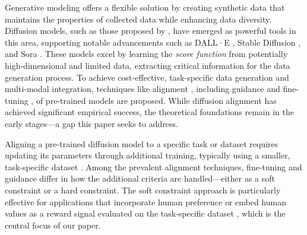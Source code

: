 \documentclass{article}
\begin{document}
Generative modeling offers a flexible solution by creating synthetic data that maintains the properties of collected data while enhancing data diversity. Diffusion models, such as those proposed by \cite{sohl2015deep,song2019generative,song2020score,Ho20}, have emerged as powerful tools in this area, supporting notable advancements such as DALL·E \cite{ramesh2022hierarchical,betker2023improving}, Stable Diffusion \cite{rombach2022high}, and Sora \cite{openai2024sora}. These models excel by learning the {\it score function} from potentially high-dimensional and limited data, extracting critical information for the data generation process. To achieve cost-effective, task-specific data generation and multi-modal integration, techniques like alignment \cite{wallace2024diffusion}, including guidance \cite{dhariwal2021diffusion,ho2022classifier} and fine-tuning \cite{fan2023optimizing,black2023training,fan2024reinforcement}, of pre-trained models are proposed. While diffusion alignment has achieved significant empirical success, the theoretical foundations remain in the early stages---a gap this paper seeks to address.

Aligning a pre-trained diffusion model to a specific task or dataset requires updating its parameters through additional training, typically using a smaller, task-specific dataset \cite{wallace2024diffusion,podell2023sdxl,rombach2022high,dai2023emu}. Among the prevalent alignment techniques, fine-tuning and guidance differ in how the additional criteria are handled—either as a soft constraint or a hard constraint. The soft constraint approach is particularly effective for applications that incorporate human preference or embed human values as a reward signal evaluated on the task-specific dataset \cite{black2023training,fan2024reinforcement,uehara2024bridging,zhao2024adding}, which is the central focus of our paper.
\end{document}

